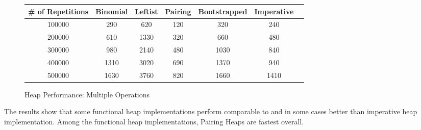 \begin{figure*}[ht]
  \begin{adjustwidth}{0em}{}
    \begin{threeparttable}
      \begin{tabular}{|c|c|c|c|c|c|c|}
        \hline
        \# of Repetitions & Binomial & Leftist & Pairing & Bootstrapped & Imperative \\%
        \hline
        100000 & 290  & 620  & 120 & 320  & 240  \\%
        \hline%
        200000 & 610  & 1330 & 320 & 660  & 480  \\%
        \hline%
        300000 & 980  & 2140 & 480 & 1030 & 840  \\%
        \hline%
        400000 & 1310 & 3020 & 690 & 1370 & 940  \\%
        \hline%
        500000 & 1630 & 3760 & 820 & 1660 & 1410 \\%
        \hline
      \end{tabular}
      \caption{Heap Performance: Multiple Operations}
      \label{fig:heap1}
    \end{threeparttable} 
  \end{adjustwidth}
\end{figure*}

The results show that some functional heap implementations perform
comparable to and in some cases better than imperative heap
implementation. Among the functional heap implementations, Pairing Heaps
are fastest overall.

